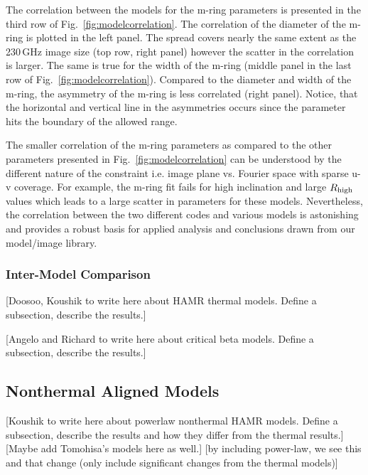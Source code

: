 The correlation between the models for the m-ring parameters is presented in the third row of Fig.~\ref{fig:modelcorrelation}. The correlation of the diameter of the m-ring is plotted in the left panel. The spread covers nearly the same extent as the 230\,GHz image size (top row, right panel) however the scatter in the correlation is larger.
The same is true for the width of the m-ring (middle panel in the last row of Fig.~\ref{fig:modelcorrelation}). Compared to the diameter and width of the m-ring, the asymmetry of the m-ring is less correlated (right panel). Notice, that the horizontal and vertical line in the asymmetries occurs since the parameter hits the boundary of the allowed range.

The smaller correlation of the m-ring parameters as compared to the other parameters presented in Fig.~\ref{fig:modelcorrelation} can be
 understood by the different nature of the constraint i.e. image plane vs. Fourier space with sparse u-v coverage. For example, the m-ring fit fails for high inclination and large $R_{\rm high}$ values which leads to a large scatter in parameters for these models. %
Nevertheless, the correlation between the two different codes and various models is astonishing and provides a robust basis for applied analysis and conclusions drawn from our model/image library.

\subsubsection{Inter-Model Comparison}

[Doosoo, Koushik to write here about HAMR thermal models.  Define a subsection, describe the results.]

[Angelo and Richard to write here about critical beta models.  Define a subsection, describe the results.]

\subsection{Nonthermal Aligned Models}

[Koushik to write here about powerlaw nonthermal HAMR models.  Define a subsection, describe the results and how they differ from the thermal results.][Maybe add Tomohisa's models here as well.] [by including power-law, we see this and that change (only include significant changes from the thermal models)]

